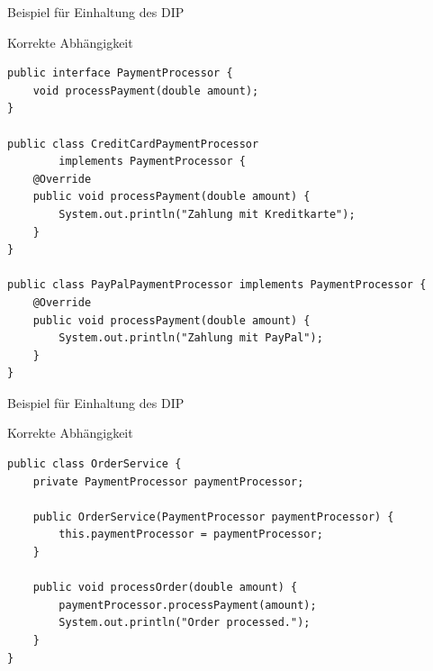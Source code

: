 \begin{frame}[fragile]{Beispiel für Einhaltung des DIP}
	\begin{exampleblock}{Korrekte Abhängigkeit}
        \begin{lstlisting}
public interface PaymentProcessor {
    void processPayment(double amount);
}

public class CreditCardPaymentProcessor 
        implements PaymentProcessor {
    @Override
    public void processPayment(double amount) {
        System.out.println("Zahlung mit Kreditkarte");
    }
}

public class PayPalPaymentProcessor implements PaymentProcessor {
    @Override
    public void processPayment(double amount) {
        System.out.println("Zahlung mit PayPal");
    }
}
        \end{lstlisting} 		
 	\end{exampleblock}
\end{frame}

\begin{frame}[fragile]{Beispiel für Einhaltung des DIP}
	\begin{exampleblock}{Korrekte Abhängigkeit}
        \begin{lstlisting}
public class OrderService {
    private PaymentProcessor paymentProcessor;

    public OrderService(PaymentProcessor paymentProcessor) {
        this.paymentProcessor = paymentProcessor;
    }

    public void processOrder(double amount) {
        paymentProcessor.processPayment(amount);
        System.out.println("Order processed.");
    }
}
        \end{lstlisting} 		
 	\end{exampleblock}
\end{frame}

